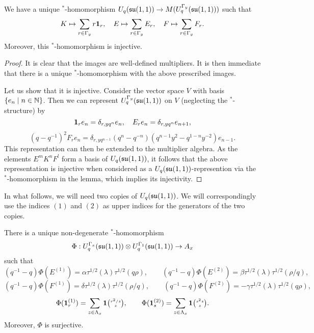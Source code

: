 \begin{Lem} We have a unique $^*$-homomorphism $U_q(\mathfrak{su}(1,1))\rightarrow M(U_q^{\Gamma_y}(\mathfrak{su}(1,1)))$ such that \[K \mapsto \sum_{r\in \Gamma_y} r\mathbf{1}_r,\quad E\mapsto \sum_{r\in \Gamma_y} E_{r},\quad F\mapsto \sum_{r\in \Gamma_y} F_r. \] Moreover, this $^*$-homomorphism is injective.
\end{Lem} 
\begin{proof} It is clear that the images are well-defined multipliers. It is then immediate that there is a unique $^*$-homomorphism with the above prescribed images.

Let us show that it is injective. Consider the vector space $V$ with basis $\{e_n\mid n\in \mathbb{N}\}$. Then we can represent $U_q^{\Gamma_y}(\mathfrak{su}(1,1))$ on $V$ (neglecting the $^*$-structure) by \[\mathbf{1}_r e_n = \delta_{r,yq^n}e_n,\quad E_{r} e_n = \delta_{r,yq^n} e_{n+1},\]\[(q-q^{-1})^2 F_{r}e_n = \delta_{r,yq^{n-1}} (q^n-q^{-n})(q^{n-1}y^2-q^{1-n}y^{-2})e_{n-1}.\] This representation can then be extended to the multiplier algebra. As the elements $E^mK^nF^l$ form a basis of $U_q(\mathfrak{su}(1,1))$, it follows that the above representation is injective when considered as a $U_q(\mathfrak{su}(1,1))$-represention via the $^*$-homomorphism in the lemma, which implies its injectivity.
\end{proof}  

In what follows, we will need two copies of $U_q(\mathfrak{su}(1,1))$. We will correspondingly use the indices $(1)$  and $(2)$ as upper indices for the generators of the two copies.
\begin{Lem} 

There is a unique non-degenerate $^*$-homomorphism \[\Phi: U_q^{\Gamma_x}(\mathfrak{su}(1,1))\otimes U_q^{\Gamma_1}(\mathfrak{su}(1,1))\rightarrow A_x\] such that 
\[(q^{-1}-q)\Phi(E^{(1)})=  \alpha \tau^{1/2}(\lambda)\tau^{1/2}(q\rho),\qquad (q^{-1}-q)\Phi( E^{(2)}) =  \beta \tau^{1/2}(\lambda)\tau^{1/2}(\rho/q),\]
\[(q^{-1}-q)\Phi(F^{(1)})=  \delta\tau^{1/2}(\lambda)\tau^{1/2}(\rho/q),\qquad (q^{-1}-q)\Phi( F^{(2)}) =  - \gamma\tau^{1/2}(\lambda)\tau^{1/2}(q\rho),\]
\[\Phi(\mathbf{1}_r^{(1)}) = \sum_{z\in \Lambda_x} \mathbf{1}{\tiny {\begin{pmatrix} r^2/z\\z\end{pmatrix}}},\qquad \Phi(\mathbf{1}_s^{(2)}) = \sum_{z\in \Lambda_x} \mathbf{1}{\tiny {\begin{pmatrix} s^2z\\z\end{pmatrix}}}.\] Moreover, $\Phi$ is surjective.
\end{Lem} 

